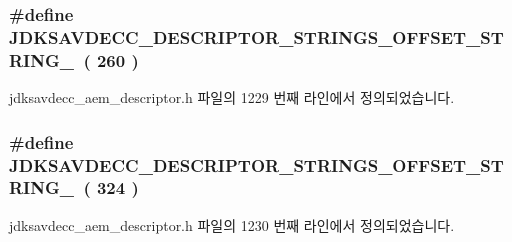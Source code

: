 \subsubsection[{\texorpdfstring{J\+D\+K\+S\+A\+V\+D\+E\+C\+C\+\_\+\+D\+E\+S\+C\+R\+I\+P\+T\+O\+R\+\_\+\+S\+T\+R\+I\+N\+G\+S\+\_\+\+O\+F\+F\+S\+E\+T\+\_\+\+S\+T\+R\+I\+N\+G\+\_\+4}{JDKSAVDECC_DESCRIPTOR_STRINGS_OFFSET_STRING_4}}]{\setlength{\rightskip}{0pt plus 5cm}\#define J\+D\+K\+S\+A\+V\+D\+E\+C\+C\+\_\+\+D\+E\+S\+C\+R\+I\+P\+T\+O\+R\+\_\+\+S\+T\+R\+I\+N\+G\+S\+\_\+\+O\+F\+F\+S\+E\+T\+\_\+\+S\+T\+R\+I\+N\+G\+\_~( 260 )}\hypertarget{group__descriptor__strings_ga14a1e954234814b95c851713024e54be}{}\label{group__descriptor__strings_ga14a1e954234814b95c851713024e54be}


jdksavdecc\+\_\+aem\+\_\+descriptor.\+h 파일의 1229 번째 라인에서 정의되었습니다.

\subsubsection[{\texorpdfstring{J\+D\+K\+S\+A\+V\+D\+E\+C\+C\+\_\+\+D\+E\+S\+C\+R\+I\+P\+T\+O\+R\+\_\+\+S\+T\+R\+I\+N\+G\+S\+\_\+\+O\+F\+F\+S\+E\+T\+\_\+\+S\+T\+R\+I\+N\+G\+\_\+5}{JDKSAVDECC_DESCRIPTOR_STRINGS_OFFSET_STRING_5}}]{\setlength{\rightskip}{0pt plus 5cm}\#define J\+D\+K\+S\+A\+V\+D\+E\+C\+C\+\_\+\+D\+E\+S\+C\+R\+I\+P\+T\+O\+R\+\_\+\+S\+T\+R\+I\+N\+G\+S\+\_\+\+O\+F\+F\+S\+E\+T\+\_\+\+S\+T\+R\+I\+N\+G\+\_~( 324 )}\hypertarget{group__descriptor__strings_ga7452da8765c20c1f989387e87405884b}{}\label{group__descriptor__strings_ga7452da8765c20c1f989387e87405884b}


jdksavdecc\+\_\+aem\+\_\+descriptor.\+h 파일의 1230 번째 라인에서 정의되었습니다.

